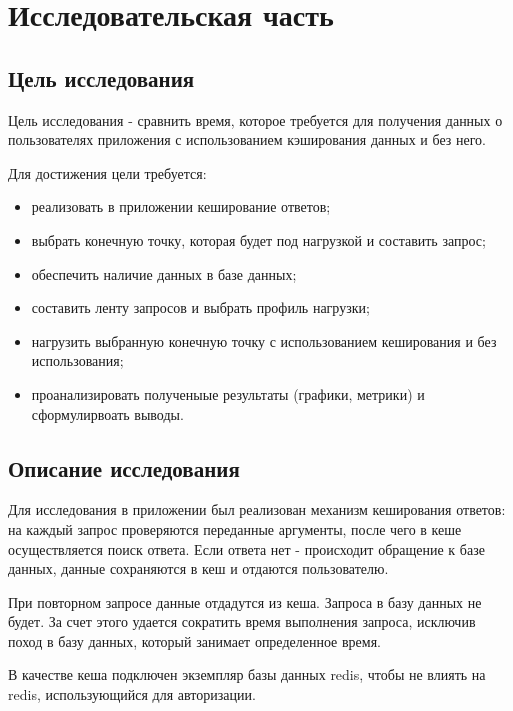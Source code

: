 \chapter{Исследовательская часть}

\section{Цель исследования}

Цель исследования - сравнить время, которое требуется для получения данных о пользователях приложения с использованием кэширования данных и без него.  

Для достижения цели требуется:
\begin{itemize}
\item реализовать в приложении кеширование ответов;
\item выбрать конечную точку, которая будет под нагрузкой и составить запрос;
\item обеспечить наличие данных в базе данных;
\item составить ленту запросов и выбрать профиль нагрузки;
\item нагрузить выбранную конечную точку с использованием кеширования и без использования;
\item проанализировать полученыые результаты (графики, метрики) и сформулирвоать выводы.
\end{itemize}

\section{Описание исследования}
Для исследования в приложении был реализован механизм кеширования ответов: на каждый запрос проверяются переданные аргументы, после чего в кеше осуществляется поиск ответа. Если ответа нет - происходит обращение к базе данных, данные сохраняются в кеш и отдаются пользователю. 

При повторном запросе данные отдадутся из кеша. Запроса в базу данных не будет. 
За счет этого удается сократить время выполнения запроса, исключив поход в базу данных, который занимает определенное время.  

В качестве кеша подключен экземпляр базы данных redis, чтобы не влиять на redis, использующийся для авторизации.  

